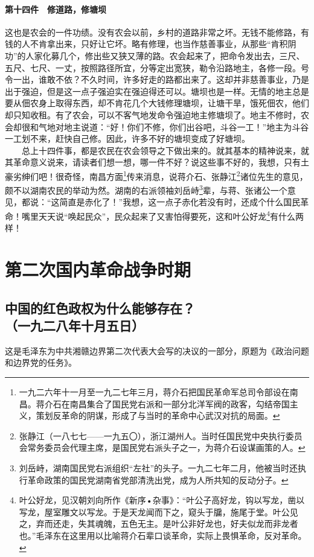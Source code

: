\documentclass[cn,11pt,chinese]{elegantbook}
\def\myformat#1{\hfil\hfil #1}
\begin{document}
\subsubsection*{\myformat{第十四件　修道路，修塘坝}}
这也是农会的一件功绩。没有农会以前，乡村的道路非常之坏。无钱不能修路，有钱的人不肯拿出来，只好让它坏。略有修理，也当作慈善事业，从那些“肯积阴功”的人家化募几个，修出些又狭又薄的路。农会起来了，把命令发出去，三尺、五尺、七尺、一丈，按照路径所宜，分等定出宽狭，勒令沿路地主，各修一段。号令一出，谁敢不依？不久时间，许多好走的路都出来了。这却并非慈善事业，乃是出于强迫，但是这一点子强迫实在强迫得还可以。塘坝也是一样。无情的地主总是要从佃农身上取得东西，却不肯花几个大钱修理塘坝，让塘干旱，饿死佃农，他们却只知收租。有了农会，可以不客气地发命令强迫地主修塘坝了。地主不修时，农会却很和气地对地主说道：“好！你们不修，你们出谷吧，斗谷一工！”地主为斗谷一工划不来，赶快自己修。因此，许多不好的塘坝变成了好塘坝。\\
　　总上十四件事，都是农民在农会领导之下做出来的。就其基本的精神说来，就其革命意义说来，请读者们想一想，哪一件不好？说这些事不好的，我想，只有土豪劣绅们吧！很奇怪，南昌方面\footnote[24]{ 一九二六年十一月至一九二七年三月，蒋介石把国民革命军总司令部设在南昌。蒋介石在南昌集合了国民党右派和一部分北洋军阀的政客，勾结帝国主义，策划反革命的阴谋，形成了与当时的革命中心武汉对抗的局面。}传来消息，说蒋介石、张静江\footnote[25]{ 张静江（一八七七——一九五〇），浙江湖州人。当时任国民党中央执行委员会常务委员会代理主席，是国民党右派头子之一，为蒋介石设谋画策的人。}诸位先生的意见，颇不以湖南农民的举动为然。湖南的右派领袖刘岳峙\footnote[26]{ 刘岳峙，湖南国民党右派组织“左社”的头子。一九二七年二月，他被当时还执行革命政策的国民党湖南省党部清洗出党，成为人所共知的反动分子。}辈，与蒋、张诸公一个意见，都说：“这简直是赤化了！”我想，这一点子赤化若没有时，还成个什么国民革命！嘴里天天说“唤起民众”，民众起来了又害怕得要死，这和叶公好龙\footnote[27]{ 叶公好龙，见汉朝刘向所作《新序•杂事》：“叶公子高好龙，钩以写龙，凿以写龙，屋室雕文以写龙。于是天龙闻而下之，窥头于牖，施尾于堂。叶公见之，弃而还走，失其魂魄，五色无主。是叶公非好龙也，好夫似龙而非龙者也。”毛泽东在这里用以比喻蒋介石辈口谈革命，实际上畏惧革命，反对革命。}有什么两样！\\
\newpage\chapter*{第二次国内革命战争时期}\newpage\section*{\myformat{中国的红色政权为什么能够存在？}\\\myformat{（一九二八年十月五日）}}
\begin{introduction}\item  这是毛泽东为中共湘赣边界第二次代表大会写的决议的一部分，原题为《政治问题和边界党的任务》。\end{introduction}
\end{document}
